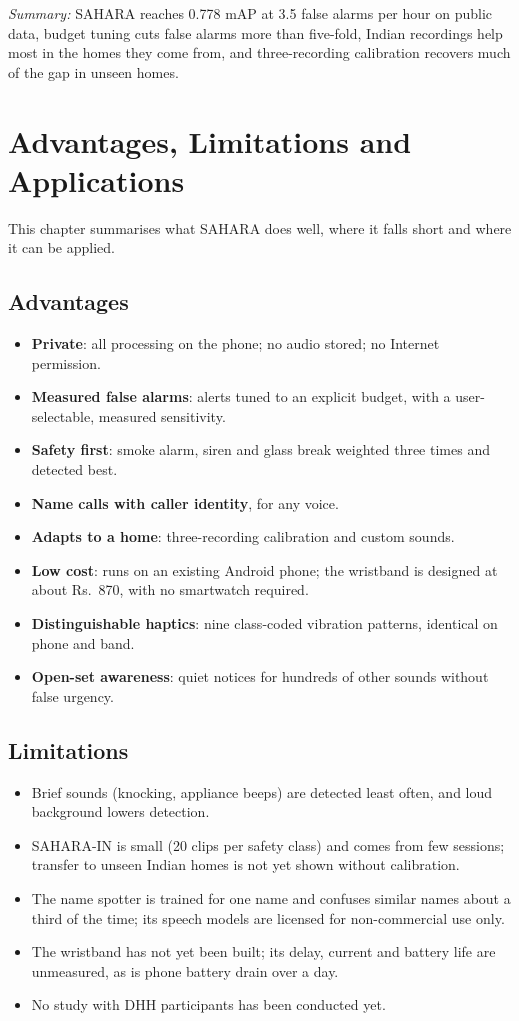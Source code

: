 \documentclass[12pt,a4paper,oneside]{report}
\begin{document}
\textit{Summary:} SAHARA reaches 0.778 mAP at 3.5 false alarms per hour on public data, budget tuning cuts false alarms more than five-fold, Indian recordings help most in the homes they come from, and three-recording calibration recovers much of the gap in unseen homes.

\chapter{Advantages, Limitations and Applications}
This chapter summarises what SAHARA does well, where it falls short and where it can be applied.

\section{Advantages}
\begin{itemize}[itemsep=2pt]
\item \textbf{Private}: all processing on the phone; no audio stored; no Internet permission.
\item \textbf{Measured false alarms}: alerts tuned to an explicit budget, with a user-selectable, measured sensitivity.
\item \textbf{Safety first}: smoke alarm, siren and glass break weighted three times and detected best.
\item \textbf{Name calls with caller identity}, for any voice.
\item \textbf{Adapts to a home}: three-recording calibration and custom sounds.
\item \textbf{Low cost}: runs on an existing Android phone; the wristband is designed at about Rs.~870, with no smartwatch required.
\item \textbf{Distinguishable haptics}: nine class-coded vibration patterns, identical on phone and band.
\item \textbf{Open-set awareness}: quiet notices for hundreds of other sounds without false urgency.
\end{itemize}

\section{Limitations}
\begin{itemize}[itemsep=2pt]
\item Brief sounds (knocking, appliance beeps) are detected least often, and loud background lowers detection.
\item SAHARA-IN is small (20 clips per safety class) and comes from few sessions; transfer to unseen Indian homes is not yet shown without calibration.
\item The name spotter is trained for one name and confuses similar names about a third of the time; its speech models are licensed for non-commercial use only.
\item The wristband has not yet been built; its delay, current and battery life are unmeasured, as is phone battery drain over a day.
\item No study with DHH participants has been conducted yet.
\end{itemize}
\end{document}
